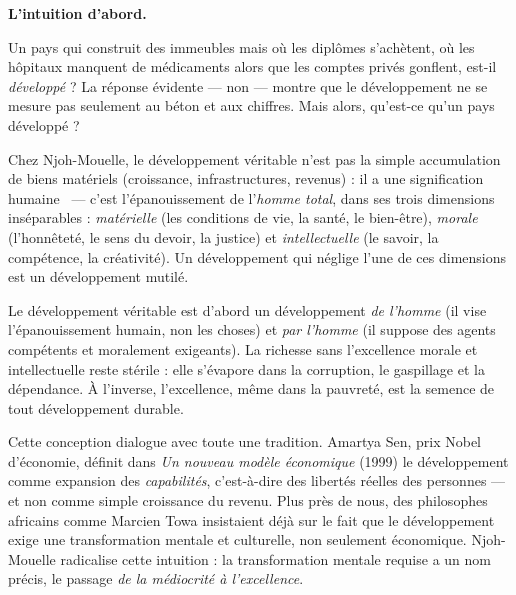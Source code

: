\documentclass[11pt]{article}
\newcommand{\cle}[1]{{\popxbold\color{popdark}#1}}
\begin{document}
\textbf{L'intuition d'abord.}\par
Un pays qui construit des immeubles mais où les diplômes s'achètent, où les hôpitaux manquent de médicaments alors que les comptes privés gonflent, est-il \emph{développé} ? La réponse évidente — non — montre que le développement ne se mesure pas seulement au béton et aux chiffres. Mais alors, qu'est-ce qu'un pays développé ?

\begin{definition}
Chez Njoh-Mouelle, le \cle{développement} véritable n'est pas la simple accumulation de biens matériels (croissance, infrastructures, revenus) : il a une \guillemotleft signification humaine \guillemotright\ — c'est l'épanouissement de l'\emph{homme total}, dans ses trois dimensions inséparables : \emph{matérielle} (les conditions de vie, la santé, le bien-être), \emph{morale} (l'honnêteté, le sens du devoir, la justice) et \emph{intellectuelle} (le savoir, la compétence, la créativité). Un développement qui néglige l'une de ces dimensions est un développement mutilé.
\end{definition}

\begin{propriete}
Le développement véritable est d'abord un développement \emph{de l'homme} (il vise l'épanouissement humain, non les choses) et \emph{par l'homme} (il suppose des agents compétents et moralement exigeants). La richesse sans l'excellence morale et intellectuelle reste stérile : elle s'évapore dans la corruption, le gaspillage et la dépendance. À l'inverse, l'excellence, même dans la pauvreté, est la semence de tout développement durable.
\end{propriete}

Cette conception dialogue avec toute une tradition. Amartya Sen, prix Nobel d'économie, définit dans \emph{Un nouveau modèle économique} (1999) le développement comme expansion des \emph{capabilités}, c'est-à-dire des libertés réelles des personnes — et non comme simple croissance du revenu. Plus près de nous, des philosophes africains comme Marcien Towa insistaient déjà sur le fait que le développement exige une transformation mentale et culturelle, non seulement économique. Njoh-Mouelle radicalise cette intuition : la transformation mentale requise a un nom précis, le passage \emph{de la médiocrité à l'excellence}.
\end{document}
